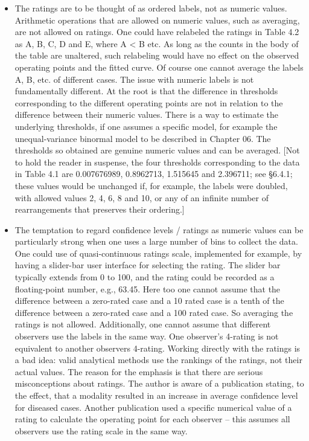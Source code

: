 \documentclass[
]{book}
\begin{document}
\begin{itemize}
\item
  The ratings are to be thought of as ordered labels, not as numeric values. Arithmetic operations that are allowed on numeric values, such as averaging, are not allowed on ratings. One could have relabeled the ratings in Table 4.2 as A, B, C, D and E, where A \textless{} B etc. As long as the counts in the body of the table are unaltered, such relabeling would have no effect on the observed operating points and the fitted curve. Of course one cannot average the labels A, B, etc. of different cases. The issue with numeric labels is not fundamentally different. At the root is that the difference in thresholds corresponding to the different operating points are not in relation to the difference between their numeric values. There is a way to estimate the underlying thresholds, if one assumes a specific model, for example the unequal-variance binormal model to be described in Chapter 06. The thresholds so obtained are genuine numeric values and can be averaged. {[}Not to hold the reader in suspense, the four thresholds corresponding to the data in Table 4.1 are 0.007676989, 0.8962713, 1.515645 and 2.396711; see §6.4.1; these values would be unchanged if, for example, the labels were doubled, with allowed values 2, 4, 6, 8 and 10, or any of an infinite number of rearrangements that preserves their ordering.{]}
\item
  The temptation to regard confidence levels / ratings as numeric values can be particularly strong when one uses a large number of bins to collect the data. One could use of quasi-continuous ratings scale, implemented for example, by having a slider-bar user interface for selecting the rating. The slider bar typically extends from 0 to 100, and the rating could be recorded as a floating-point number, e.g., 63.45. Here too one cannot assume that the difference between a zero-rated case and a 10 rated case is a tenth of the difference between a zero-rated case and a 100 rated case. So averaging the ratings is not allowed. Additionally, one cannot assume that different observers use the labels in the same way. One observer's 4-rating is not equivalent to another observers 4-rating. Working directly with the ratings is a bad idea: valid analytical methods use the rankings of the ratings, not their actual values. The reason for the emphasis is that there are serious misconceptions about ratings. The author is aware of a publication stating, to the effect, that a modality resulted in an increase in average confidence level for diseased cases. Another publication used a specific numerical value of a rating to calculate the operating point for each observer -- this assumes all observers use the rating scale in the same way.
\end{itemize}
\end{document}
